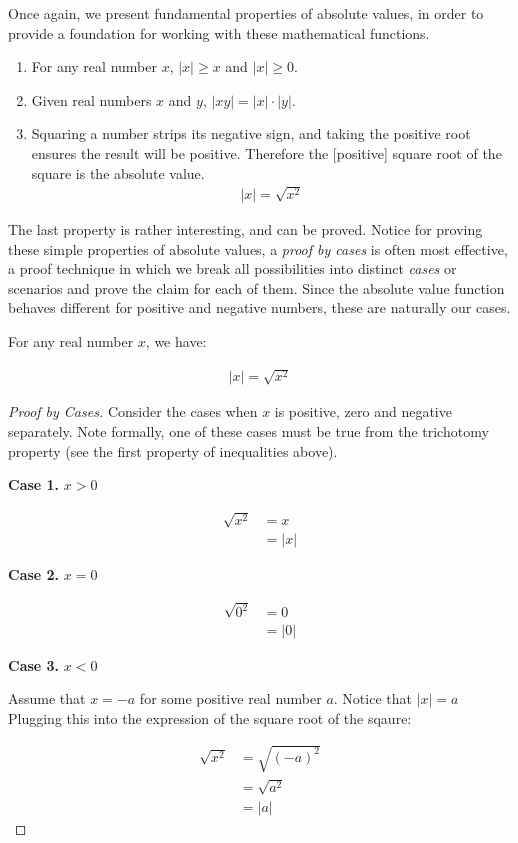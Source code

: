 \documentclass[twoside]{report}
\newcommand{\header}[2]{\begin{flushright} \textbf{#1} #2 \end{flushright}}
\begin{document}
Once again, we present fundamental properties of absolute values, in order to provide a foundation for working with these mathematical functions.

\begin{enumerate}
	\item For any real number $x$, $|x| \ge x$ and $|x| \ge 0$.
	\item Given real numbers $x$ and $y$, $|xy| = |x| \cdot |y|$.
	\item Squaring a number strips its negative sign, and taking the positive root ensures the result will be positive. Therefore the [positive] square root of the square is the absolute value.
	\begin{align*}
		|x| = \sqrt{x^2}
	\end{align*}
\end{enumerate}

The last property is rather interesting, and can be proved. Notice for proving these simple properties of absolute values, a \emph{proof by cases}  is often most effective, a proof technique in which we break all possibilities into distinct \emph{cases} or scenarios and prove the claim for each of them. Since the absolute value function behaves different for positive and negative numbers, these are naturally our cases.

\vspace{\baselineskip}
\begin{theorem}
	For any real number $x$, we have:
	
	\begin{align}
		|x| = \sqrt{x^2}
	\end{align}
\end{theorem}

\begin{proof}[Proof by Cases]
	Consider the cases when $x$ is positive, zero and negative separately. Note formally, one of these cases must be true from the trichotomy property (see the first property of inequalities above).
	
	\header{Case 1.}{$x > 0$}
	
	\begin{align*}
		\sqrt{x^2} &= x \\
		&= |x|
	\end{align*}
	
	\header{Case 2.}{$x = 0$}
	
	\begin{align*}
		\sqrt{0^2} &= 0 \\
		&= |0|
	\end{align*}
	
	\header{Case 3.}{$x < 0$}
	Assume that $x = -a$ for some positive real number $a$. Notice that $|x| = a$ Plugging this into the expression of the square root of the sqaure:
	
	\begin{align*}
		\sqrt{x^2} &= \sqrt{(-a)^2} \\
		&= \sqrt{a^2} \\
		&= |a|
	\end{align*}
\end{proof}
\vspace{\baselineskip}
\end{document}
